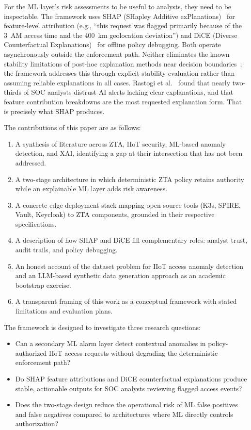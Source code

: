 \documentclass[conference]{IEEEtran}
\begin{document}
For the ML layer's risk assessments to be useful to analysts, they need to be inspectable. The framework uses SHAP (SHapley Additive exPlanations)~\cite{lundberg2017} for feature-level attribution (e.g., ``this request was flagged primarily because of the 3~AM access time and the 400~km geolocation deviation'') and DiCE (Diverse Counterfactual Explanations)~\cite{mothilal2020} for offline policy debugging. Both operate asynchronously outside the enforcement path. Neither eliminates the known stability limitations of post-hoc explanation methods near decision boundaries~\cite{alvarez2018, jiang2024}; the framework addresses this through explicit stability evaluation rather than assuming reliable explanations in all cases. Rastogi et al.~\cite{rastogi2025} found that nearly two-thirds of SOC analysts distrust AI alerts lacking clear explanations, and that feature contribution breakdowns are the most requested explanation form. That is precisely what SHAP produces.

The contributions of this paper are as follows:
\begin{enumerate}
    \item A synthesis of literature across ZTA, IIoT security, ML-based anomaly detection, and XAI, identifying a gap at their intersection that has not been addressed.
    \item A two-stage architecture in which deterministic ZTA policy retains authority while an explainable ML layer adds risk awareness.
    \item A concrete edge deployment stack mapping open-source tools (K3s, SPIRE, Vault, Keycloak) to ZTA components, grounded in their respective specifications.
    \item A description of how SHAP and DiCE fill complementary roles: analyst trust, audit trails, and policy debugging.
    \item An honest account of the dataset problem for IIoT access anomaly detection and an LLM-based synthetic data generation approach as an academic bootstrap exercise.
    \item A transparent framing of this work as a conceptual framework with stated limitations and evaluation plans.
\end{enumerate}

The framework is designed to investigate three research questions:
\begin{itemize}
    \item[\textbf{RQ1.}] Can a secondary ML alarm layer detect contextual anomalies in policy-authorized IIoT access requests without degrading the deterministic enforcement path?
    \item[\textbf{RQ2.}] Do SHAP feature attributions and DiCE counterfactual explanations produce stable, actionable outputs for SOC analysts reviewing flagged access events?
    \item[\textbf{RQ3.}] Does the two-stage design reduce the operational risk of ML false positives and false negatives compared to architectures where ML directly controls authorization?
\end{itemize}
\end{document}
